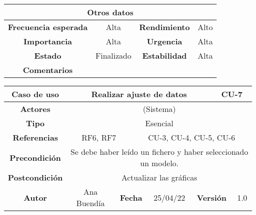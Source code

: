\begin{table}[!h]
\begin{tabular}{|c|c|c|c|}
\hline
\multicolumn{4}{|c|}{\cellcolor{cyan} \textbf{Otros datos}} \\
\hline
 \cellcolor{cyan} \textbf{Frecuencia esperada}             &       Alta        &    \cellcolor{cyan} \textbf{Rendimiento}          &       Alto       \\
\hline
 \cellcolor{cyan} \textbf{Importancia}             &      Alta         &     \cellcolor{cyan} \textbf{Urgencia}         &       Alta       \\
\hline
 \cellcolor{cyan} \textbf{Estado}             &      Finalizado         &    \cellcolor{cyan} \textbf{Estabilidad}          &      Alta        \\
\hline
 \cellcolor{cyan} \textbf{Comentarios}        &  \multicolumn{3}{|c|}{} \\
\hline
\end{tabular}
\end{table}





\clearpage

\begin{table}[!h]
\begin{tabular}{|c|c|c|c|c|c|c|c|}
\hline
\rowcolor{cyan} \textbf{Caso de uso} & \multicolumn{5}{|c|}{Realizar ajuste de datos} & \multicolumn{2}{|c|}{CU-7} \\
\hline
\cellcolor{cyan} \textbf{Actores}              & \multicolumn{7}{|c|}{(Sistema)}           \\
\hline
\cellcolor{cyan} \textbf{Tipo}                 & \multicolumn{7}{|c|}{Esencial}             \\
\hline
\cellcolor{cyan} \textbf{Referencias}          & \multicolumn{2}{|c|}{RF6, RF7}           & \multicolumn{5}{|c|}{CU-3, CU-4, CU-5, CU-6}\\
\hline
\cellcolor{cyan} \textbf{Precondición}         & \multicolumn{7}{|c|}{Se debe haber leído un fichero y haber seleccionado un modelo.}             \\
\hline
\cellcolor{cyan} \textbf{Postcondición}        & \multicolumn{7}{|c|}{Actualizar las gráficas}              \\
\hline
\cellcolor{cyan} \textbf{Autor}                &   Ana Buendía   & \multicolumn{2}{|c|}{\cellcolor{cyan} \textbf{Fecha}} &  25/04/22   & \multicolumn{2}{|c|}{\cellcolor{cyan} \textbf{Versión}} & 1.0  \\
\hline
\end{tabular}
\end{table}

